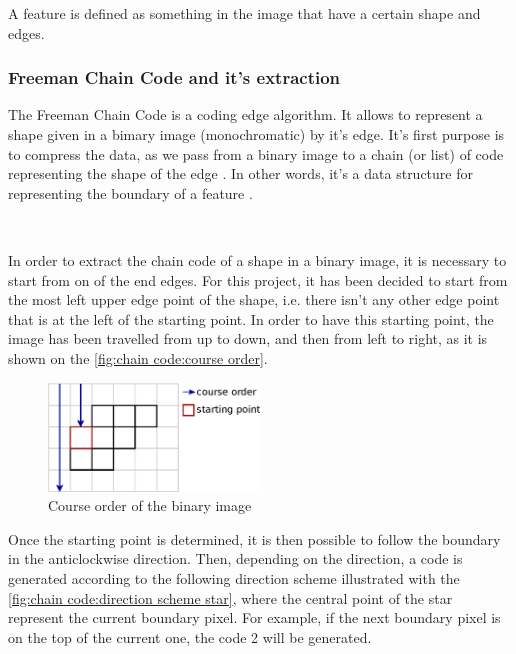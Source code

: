 A feature is defined as something in the image that have a certain shape and edges. 






\subsubsection{Freeman Chain Code and it's extraction}

The Freeman Chain Code is a coding edge algorithm. It allows to represent a shape given in a bimary image (monochromatic) by it's edge. It's first purpose is to compress the data, as we pass from a binary image to a chain (or list) of code representing the shape of the edge \cite{bib:chain:ParametreGeometriqueChaineFreeman}. In other words, it's a data structure for representing the boundary of a feature \cite{bib:chain:DigitalImageProcessing}.

~~

In order to extract the chain code of a shape in a binary image, it is necessary to start from on of the end edges. For this project, it has been decided to start from the most left upper edge point of the shape, i.e. there isn't any other edge point that is at the left of the starting point. In order to have this starting point, the image has been travelled from up to down, and then from left to right, as it is shown on the \vref{fig:chain code:course order}.

\begin{figure}[H]
	\centering
	\includegraphics[width=0.5\textwidth]{images/chain_code/course_order}
	\caption{Course order of the binary image \cite{bib:chain:ParametreGeometriqueChaineFreeman}}
	\label{fig:chain code:course order}	
\end{figure}

Once the starting point is determined, it is then possible to follow the boundary in the anticlockwise direction. Then, depending on the direction, a code is generated according to the following direction scheme illustrated with the \vref{fig:chain code:direction scheme star}, where the central point of the star represent the current boundary pixel. For example, if the next boundary pixel is on the top of the current one, the code 2 will be generated. 


